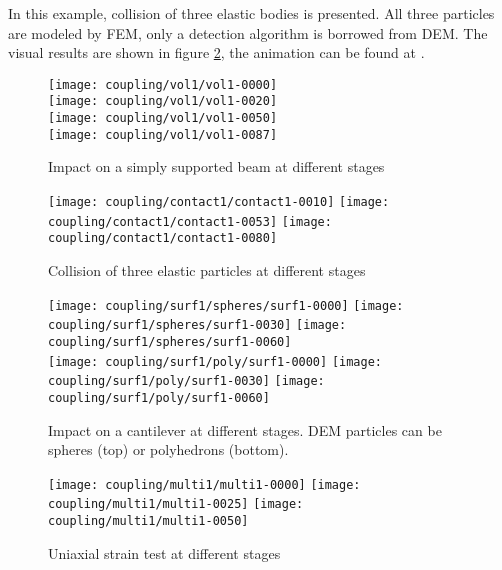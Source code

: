 In this example, collision of three elastic bodies is presented.
All three particles are modeled by FEM, only a detection algorithm is borrowed from DEM.
The visual results are shown in figure \ref{figCouplingConcurrentContactExample1}, the animation can be found at .






\cleardoublepage

\begin{figure}[p]
	\centering
	\texttt{[image: coupling/vol1/vol1-0000]}
	\\
	\texttt{[image: coupling/vol1/vol1-0020]}
	\\
	\texttt{[image: coupling/vol1/vol1-0050]}
	\\
	\texttt{[image: coupling/vol1/vol1-0087]}
	\caption{Impact on a simply supported beam at different stages}
	\label{figCouplingConcurrentVolumeExample1}
\end{figure}

\begin{figure}[p]
	\centering
	\texttt{[image: coupling/contact1/contact1-0010]}
	\texttt{[image: coupling/contact1/contact1-0053]}
	\texttt{[image: coupling/contact1/contact1-0080]}
	\caption{Collision of three elastic particles at different stages}
	\label{figCouplingConcurrentContactExample1}
\end{figure}

\begin{figure}[p]
	\centering
	\texttt{[image: coupling/surf1/spheres/surf1-0000]}
	\texttt{[image: coupling/surf1/spheres/surf1-0030]}
	\texttt{[image: coupling/surf1/spheres/surf1-0060]}
	\\
	\texttt{[image: coupling/surf1/poly/surf1-0000]}
	\texttt{[image: coupling/surf1/poly/surf1-0030]}
	\texttt{[image: coupling/surf1/poly/surf1-0060]}
	\caption[Impact on a cantilever at different stages]{Impact on a cantilever at different stages. DEM particles can be spheres (top) or polyhedrons (bottom).}
	\label{figCouplingConcurrentSurfaceExample1}
\end{figure}

\begin{figure}[p]
	\centering
	\texttt{[image: coupling/multi1/multi1-0000]}
	\texttt{[image: coupling/multi1/multi1-0025]}
	\texttt{[image: coupling/multi1/multi1-0050]}
	\caption{Uniaxial strain test at different stages}
	\label{figCouplingConcurrentMultiExample1}
\end{figure}









